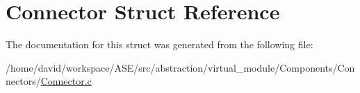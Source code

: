 \hypertarget{structConnector}{
\section{Connector Struct Reference}
\label{structConnector}
}


The documentation for this struct was generated from the following file:\begin{CompactItemize}
\item 
/home/david/workspace/ASE/src/abstraction/virtual\_\-module/Components/Connectors/\hyperlink{Connector_8c}{Connector.c}\end{CompactItemize}
